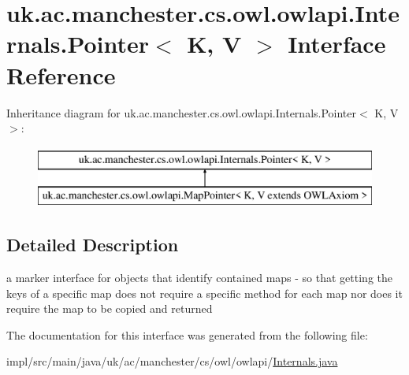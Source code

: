 \hypertarget{interfaceuk_1_1ac_1_1manchester_1_1cs_1_1owl_1_1owlapi_1_1_internals_1_1_pointer_3_01_k_00_01_v_01_4}{\section{uk.\-ac.\-manchester.\-cs.\-owl.\-owlapi.\-Internals.\-Pointer$<$ K, V $>$ Interface Reference}
\label{interfaceuk_1_1ac_1_1manchester_1_1cs_1_1owl_1_1owlapi_1_1_internals_1_1_pointer_3_01_k_00_01_v_01_4}
}
Inheritance diagram for uk.\-ac.\-manchester.\-cs.\-owl.\-owlapi.\-Internals.\-Pointer$<$ K, V $>$\-:\begin{figure}[H]
\begin{center}
\leavevmode
\includegraphics[height=2.000000cm]{interfaceuk_1_1ac_1_1manchester_1_1cs_1_1owl_1_1owlapi_1_1_internals_1_1_pointer_3_01_k_00_01_v_01_4}
\end{center}
\end{figure}


\subsection{Detailed Description}
a marker interface for objects that identify contained maps -\/ so that getting the keys of a specific map does not require a specific method for each map nor does it require the map to be copied and returned 

The documentation for this interface was generated from the following file\-:\begin{DoxyCompactItemize}
\item 
impl/src/main/java/uk/ac/manchester/cs/owl/owlapi/\hyperlink{_internals_8java}{Internals.\-java}\end{DoxyCompactItemize}
